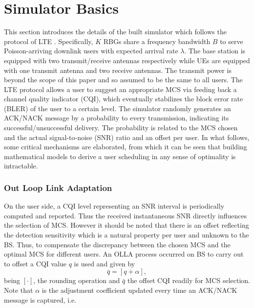 \documentclass[conference,compsocconf]{IEEEtran}
\begin{document}
\section{Simulator Basics}


This section introduces the details of the built simulator which follows the protocol of LTE \cite{protocol2013}. Specifically,  $K$ RBGs share a frequency bandwidth $B$ to serve Poisson-arriving downlink users with expected arrival rate $\lambda$. The base station is equipped with two transmit/receive antennas respectively while UEs are equipped with one transmit antenna and two receive antennas. The transmit power is beyond the scope of this paper and so assumed to be the same to all users. The LTE protocol allows a user to suggest an appropriate MCS via feeding back a channel quality indicator (CQI), which eventually stabilizes the block error rate (BLER) of the user to a certain level. The simulator randomly generates an ACK/NACK message by a probability to every transmission, indicating its successful/unsuccessful delivery. The probability is related to the MCS chosen and the actual signal-to-noise (SNR) ratio and an offset per user. In what follows, some critical mechanisms are elaborated, from which it can be seen that building mathematical models to derive a user scheduling in any sense of optimality is intractable.


\subsubsection{Out Loop Link Adaptation}
On the user side, a CQI level representing an SNR interval is periodically computed and reported. Thus the received instantaneous SNR directly influences the selection of MCS. %
However it should be noted that there is an offset reflecting the detection sensitivity which is a natural property per user and unknown to the BS. Thus, to compensate the discrepancy between the chosen MCS and the optimal MCS for different users. An OLLA process occurred on BS to carry out to offset a CQI value $q$ is used and given by
\begin{equation}
\bar{q}=\left[q+\alpha\right],
\end{equation}
being $[\cdot]$, the rounding operation and $\bar{q}$ the offset CQI readily for MCS selection. Note that $\alpha$ is the adjustment coefficient updated every time an ACK/NACK message is captured, i.e.
\end{document}
